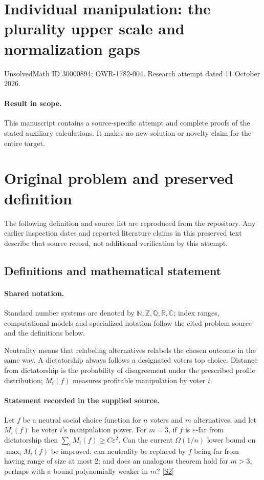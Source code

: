 \documentclass[11pt]{article}
\begin{document}
\section*{Individual manipulation: the plurality upper scale and normalization gaps}
\noindent UnsolvedMath ID 30000894; OWR-1782-004. Research attempt dated 11 October 2026.
\paragraph{Result in scope.}This manuscript contains a source-specific attempt and complete proofs of the stated auxiliary calculations. It makes no new solution or novelty claim for the entire target.
\section{Original problem and preserved definition}
The following definition and source list are reproduced from the repository. Any earlier inspection dates and reported literature claims in this preserved text describe that source record, not additional verification by this attempt.
\subsection{Definitions and mathematical statement}

\paragraph{Shared notation.}Standard number systems are denoted by $\mathbb N,\mathbb Z,\mathbb Q,\mathbb R,\mathbb C$; index ranges, computational models and specialized notation follow the cited problem source and the definitions below.


Neutrality means that relabeling alternatives relabels the chosen outcome in the same way. A dictatorship always follows a designated voter\textquotesingle s top choice. Distance from dictatorship is the probability of disagreement under the prescribed profile distribution; $M_i(f)$ measures profitable manipulation by voter $i$.
\paragraph{Statement recorded in the supplied source.}
Let $f$ be a neutral social choice function for $n$ voters and $m$ alternatives, and let $M_i(f)$ be voter $i$'s manipulation power. For $m=3$, if $f$ is $\varepsilon$-far from dictatorship then $\sum_iM_i(f)\geq C\varepsilon^2$. Can the current $\Omega(1/n)$ lower bound on $\max_iM_i(f)$ be improved; can neutrality be replaced by $f$ being far from having range of size at most 2; and does an analogous theorem hold for $m>3$, perhaps with a bound polynomially weaker in $m$? \href{https://doi.org/10.4171/owr/2008/01}{[S2]}
\end{document}
